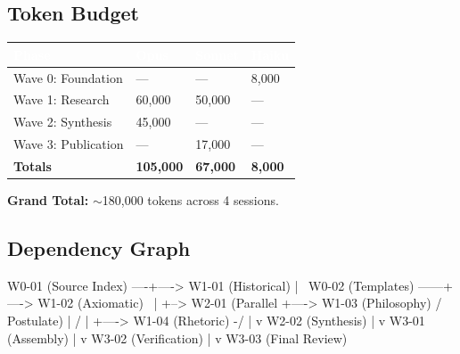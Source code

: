 \documentclass[11pt,letterpaper]{article}
\newcommand{\tableheader}[1]{\textbf{\sffamily\textcolor{white}{#1}}}
\begin{document}
\subsection{Token Budget}

\begin{center}
\begin{tabularx}{\textwidth}{L{4cm}C{2cm}C{2cm}C{2cm}}
\toprule
{}
\tableheader{Phase} & \tableheader{Opus} & \tableheader{Sonnet} & \tableheader{Haiku} \\
\midrule
Wave 0: Foundation & --- & --- & 8,000 \\
Wave 1: Research & 60,000 & 50,000 & --- \\
Wave 2: Synthesis & 45,000 & --- & --- \\
Wave 3: Publication & --- & 17,000 & --- \\
\midrule
\textbf{Totals} & \textbf{105,000} & \textbf{67,000} & \textbf{8,000} \\
\bottomrule
\end{tabularx}
\end{center}

\textbf{Grand Total:} $\sim$180,000 tokens across 4 sessions.

\subsection{Dependency Graph}

\begin{asciibox}
W0-01 (Source Index) ----+----> W1-01 (Historical)
                         |                          \
W0-02 (Templates)  ------+----> W1-02 (Axiomatic)    \
                         |                             +--> W2-01 (Parallel
                         +----> W1-03 (Philosophy)    /     Postulate)
                         |                          /            |
                         +----> W1-04 (Rhetoric)  -/             |
                                                                 v
                                                          W2-02 (Synthesis)
                                                                 |
                                                                 v
                                                          W3-01 (Assembly)
                                                                 |
                                                                 v
                                                          W3-02 (Verification)
                                                                 |
                                                                 v
                                                          W3-03 (Final Review)
\end{asciibox}
\end{document}
